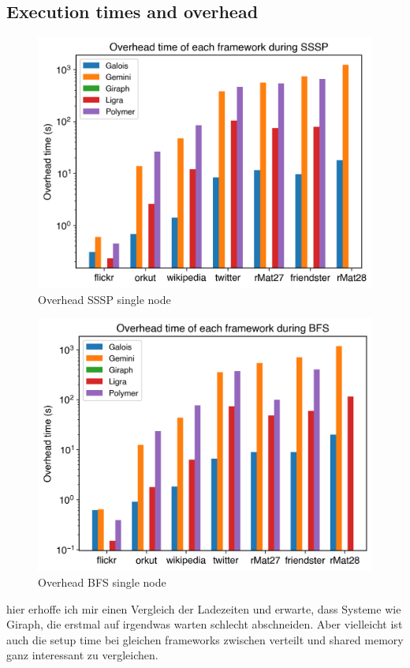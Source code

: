\subsection{Execution times and overhead}



\begin{figure}
	\includegraphics[width=\columnwidth]{../../plots/singleNodeSSSP_overheadTime.png}
	\caption{Overhead SSSP single node}
	\label{fig:singleNodeSSSP_overhead}
\end{figure}



\begin{figure}
	\includegraphics[width=\columnwidth]{../../plots/singleNodeBFS_overheadTime.png}
	\caption{Overhead BFS single node}
	\label{fig:singleNodeBFS_overhead}
\end{figure}



hier erhoffe ich mir einen Vergleich der Ladezeiten und erwarte, dass Systeme wie Giraph, die erstmal auf irgendwas warten schlecht abschneiden.
Aber vielleicht ist auch die setup time bei gleichen frameworks zwischen verteilt und shared memory ganz interessant zu vergleichen. 
